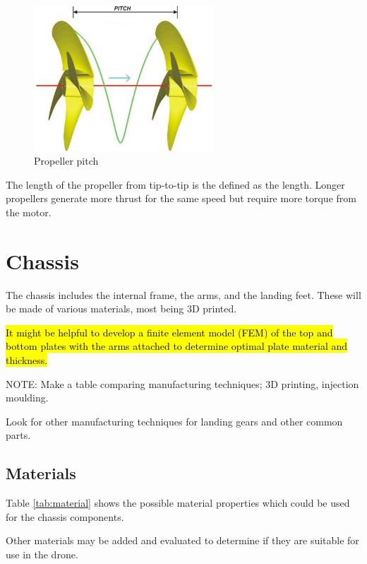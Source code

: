 \begin{figure}[!htb]
	\graphicspath{ {Images/} }
	\centering
	\includegraphics[width=0.6\textwidth,scale=0.8]{propeller.jpg}
	\caption{Propeller pitch }
	\label{fig:propeller}
\end{figure}

The length of the propeller from tip-to-tip is the defined as the length. Longer propellers generate more thrust for the same speed but require more torque from the motor. 

\section{Chassis}
The chassis includes the internal frame, the arms, and the landing feet. These will be made of various materials, most being 3D printed.

\hl{It might be helpful to develop a finite element model (FEM) of the top and bottom plates with the arms attached to determine optimal plate material and thickness.}

NOTE: Make a table comparing manufacturing techniques; 3D printing, injection moulding.

Look for other manufacturing techniques for landing gears and other common parts.

\subsection{Materials}
Table \ref{tab:material} shows the possible material properties which could be used for the chassis components. 

Other materials may be added and evaluated to determine if they are suitable for use in the drone. 

